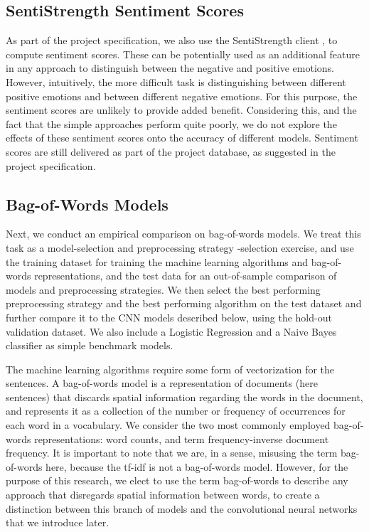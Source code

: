 \documentclass[conference]{IEEEtran}
\begin{document}
\subsection{SentiStrength Sentiment Scores}
As part of the project specification, we also use the SentiStrength client \cite{sentistrength}, to compute sentiment scores. These can be potentially used as an additional feature in any approach to distinguish between the negative and positive emotions. However, intuitively, the more difficult task is distinguishing between different positive emotions and between different negative emotions. For this purpose, the sentiment scores are unlikely to provide added benefit. Considering this, and the fact that the simple approaches perform quite poorly, we do not explore the effects of these sentiment scores onto the accuracy of different models. Sentiment scores are still delivered as part of the project database, as suggested in the project specification.

\subsection{Bag-of-Words Models}

Next, we conduct an empirical comparison on bag-of-words models. We treat this task as a model-selection and preprocessing strategy -selection exercise, and use the training dataset for training the machine learning algorithms and bag-of-words representations, and the test data for an out-of-sample comparison of models and preprocessing strategies. We then select the best performing preprocessing strategy and the best performing algorithm on the test dataset and further compare it to the CNN models described below, using the hold-out validation dataset. We also include a Logistic Regression and a Naive Bayes classifier as simple benchmark models.

The machine learning algorithms require some form of vectorization for the sentences. A bag-of-words model is a representation of documents (here sentences) that discards spatial information regarding the words in the document, and represents it as a collection of the number or frequency of occurrences for each word in a vocabulary. We consider the two most commonly employed bag-of-words representations: word counts\cite{luhn}, and term frequency-inverse document frequency\cite{tfidf}. It is important to note that we are, in a sense, misusing the term bag-of-words here, because the tf-idf is not a bag-of-words model. However, for the purpose of this research, we elect to use the term bag-of-words to describe any approach that disregards spatial information between words, to create a distinction between this branch of models and the convolutional neural networks that we introduce later.
\end{document}
